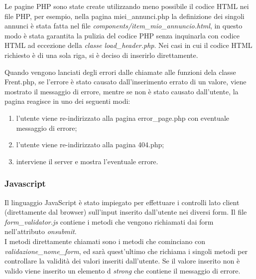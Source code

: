 \documentclass[1_relazione.tex]{subfiles}
\begin{document}
Le pagine PHP sono state create utilizzando meno possibile il codice HTML nei file PHP, per esempio, nella pagina miei\_annunci.php la definizione dei singoli annunci \`{e} stata fatta nel file \textit{components/item\_mio\_annuncio.html}, in questo modo \`{e} stata garantita la pulizia del codice PHP senza inquinarla con codice HTML ad eccezione della \textit{classe load\_header.php}. Nei casi in cui il codice HTML richiesto \`{e} di una sola riga, si \`{e} deciso di inserirlo direttamente.

Quando vengono lanciati degli errori dalle chiamate alle funzioni dela classe Frent.php, se l'errore \`{e} stato causato dall'inserimento errato di un valore, viene mostrato il messaggio di errore, mentre se non \`{e} stato causato dall'utente, la pagina reagisce in uno dei seguenti modi:
\begin{enumerate}
    \item l'utente viene re-indirizzato alla pagina error\_page.php con eventuale messaggio di errore;
    \item l'utente viene re-indirizzato alla pagina 404.php;
    \item interviene il server e mostra l'eventuale errore. 
\end{enumerate}

    \subsubsection{Javascript}
    Il linguaggio JavaScript \`{e} stato impiegato per effettuare i controlli lato client (direttamente dal browser) sull'input inserito dall'utente nei diversi form.
    Il file \textit{form_validator.js} contiene i metodi che vengono richiamati dai form nell'attributo \textit{onsubmit}.\\
    I metodi direttamente chiamati sono i metodi che cominciano con \textit{validazione_nome_form}, ed sar\`{a} quest'ultimo che richiama i singoli metodi per controllare la validit\`{a} dei valori inseriti dall'utente.
    Se il valore inserito non \`{e} valido viene inserito un elemento d \textit{strong} che contiene il messaggio di errore.
\end{document}
